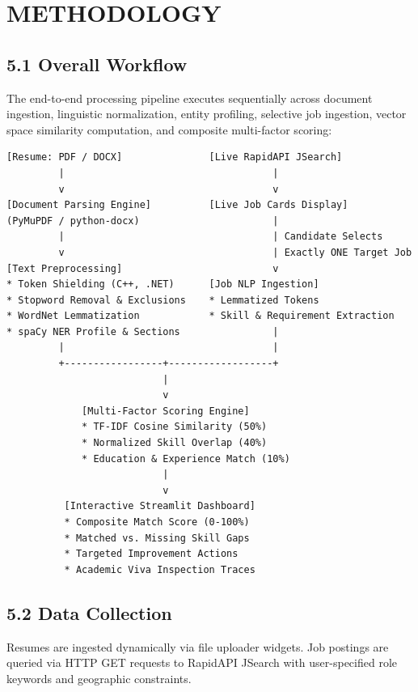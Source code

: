 \documentclass[11pt,a4paper]{article}
\begin{document}
\section{METHODOLOGY}

\subsection{5.1 Overall Workflow}
The end-to-end processing pipeline executes sequentially across document ingestion, linguistic normalization, entity profiling, selective job ingestion, vector space similarity computation, and composite multi-factor scoring:

\begin{center}
\begin{minipage}{0.95\textwidth}
\begin{lstlisting}
[Resume: PDF / DOCX]               [Live RapidAPI JSearch]
         |                                    |
         v                                    v
[Document Parsing Engine]          [Live Job Cards Display]
(PyMuPDF / python-docx)                       |
         |                                    | Candidate Selects
         v                                    | Exactly ONE Target Job
[Text Preprocessing]                          v
* Token Shielding (C++, .NET)      [Job NLP Ingestion]
* Stopword Removal & Exclusions    * Lemmatized Tokens
* WordNet Lemmatization            * Skill & Requirement Extraction
* spaCy NER Profile & Sections                |
         |                                    |
         +-----------------+------------------+
                           |
                           v
             [Multi-Factor Scoring Engine]
             * TF-IDF Cosine Similarity (50%)
             * Normalized Skill Overlap (40%)
             * Education & Experience Match (10%)
                           |
                           v
          [Interactive Streamlit Dashboard]
          * Composite Match Score (0-100%)
          * Matched vs. Missing Skill Gaps
          * Targeted Improvement Actions
          * Academic Viva Inspection Traces
\end{lstlisting}
\end{minipage}
\end{center}

\subsection{5.2 Data Collection}
Resumes are ingested dynamically via file uploader widgets. Job postings are queried via HTTP GET requests to RapidAPI JSearch with user-specified role keywords and geographic constraints.
\end{document}

